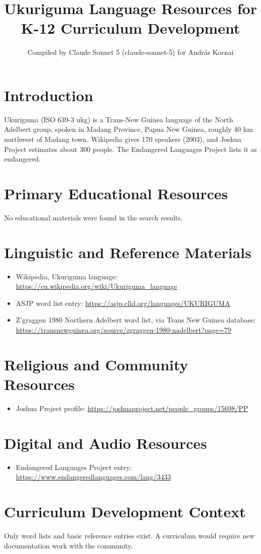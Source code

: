\documentclass[12pt]{article}
\title{Ukuriguma Language Resources for K-12 Curriculum Development}
\author{Compiled by Claude Sonnet 5 (claude-sonnet-5) for Andr\'as Kornai}
\date{}
\begin{document}
\maketitle
\section{Introduction}
Ukuriguma (ISO 639-3 ukg) is a Trans-New Guinea language of the North Adelbert group, spoken in Madang Province, Papua New Guinea, roughly 40 km northwest of Madang town. Wikipedia gives 170 speakers (2003), and Joshua Project estimates about 300 people. The Endangered Languages Project lists it as endangered.
\section{Primary Educational Resources}
No educational materials were found in the search results.
\section{Linguistic and Reference Materials}
\begin{itemize}
\item Wikipedia, Ukuriguma language: \url{https://en.wikipedia.org/wiki/Ukuriguma_language}
\item ASJP word list entry: \url{https://asjp.clld.org/languages/UKURIGUMA}
\item Z'graggen 1980 Northern Adelbert word list, via Trans New Guinea database: \url{https://transnewguinea.org/source/zgraggen-1980-nadelbert?page=79}
\end{itemize}
\section{Religious and Community Resources}
\begin{itemize}
\item Joshua Project profile: \url{https://joshuaproject.net/people_groups/15698/PP}
\end{itemize}
\section{Digital and Audio Resources}
\begin{itemize}
\item Endangered Languages Project entry: \url{https://www.endangeredlanguages.com/lang/3433}
\end{itemize}
\section{Curriculum Development Context}
Only word lists and basic reference entries exist. A curriculum would require new documentation work with the community.
\end{document}
